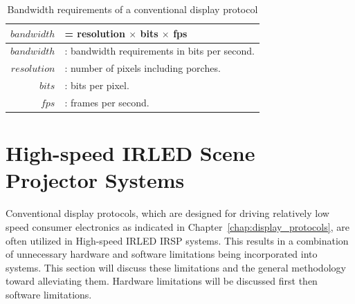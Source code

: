     \begin{table}
        \centering
        \large
        \begin{tabular}{| r l |}
            \hline
            $bandwidth$ & = resolution $\times$ bits $\times$ fps \\ \hline
            $bandwidth$ & : bandwidth requirements in bits per second. \\
            $resolution$ & : number of pixels including porches. \\
            $bits$ & : bits per pixel. \\
            $fps$ & : frames per second. \\
            \hline
        \end{tabular}
        \caption{Bandwidth requirements of a conventional display protocol}
        \label{tbl:bandwidth}
    \end{table}

\section{High-speed IRLED Scene Projector Systems}

    Conventional display protocols, which are designed for driving relatively low speed consumer electronics as indicated in Chapter~\ref{chap:display_protocols}, are often utilized in High-speed IRLED IRSP systems. This results in a combination of unnecessary hardware and software limitations being incorporated into systems. This section will discuss these limitations and the general methodology toward alleviating them. Hardware limitations will be discussed first then software limitations.

